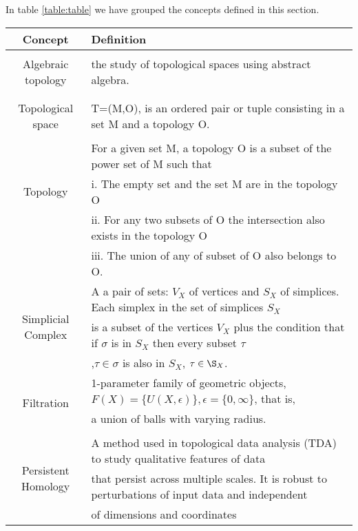 \documentclass[onecollarge,runningheads]{svjour2}
\begin{document}
In table \ref{table:table} we have grouped the concepts defined in this section.
\begin{center}
\begin{tabular}{ |c|l| }
\hline
 Concept & Definition\\ \hline
\multirow{3}{*}{Algebraic topology}
 & {}  \\
 & {the study of topological spaces using abstract algebra.}  \\
 & {}  \\ 
 \hline
\multirow{3}{*}{Topological space} 
 & { }  \\
 & {T=(M,O), is an ordered pair or tuple consisting in a set M and a topology O.}  \\
 &   \\ 
 \hline
 \multirow{3}{*}{Topology} 
 & {For a given set M, a topology O is a subset of the power set of M such that} \\
 & {i. The empty set and the set M are in the topology O }  \\
 &  {ii. For any two subsets of O the intersection also exists in the topology O } \\ 
  &  {iii. The union of any of subset of O also belongs to O.} \\ 
 \hline
\multirow{3}{*}{Simplicial Complex} 
 & {A a pair of sets: $V_X$ of vertices and $S_X$ of simplices. Each simplex in the set of simplices $S_X$ }  \\
 & {is a subset of the vertices $V_X$ plus the condition that if $\sigma$ is in $S_X$ then every subset $\tau$ }  \\
 & ,$\tau \in \sigma$ is also in $S_X$, $\tau \in \S_X$.  \\ 
 \hline
  \multirow{3}{*}{Filtration} 
 & {1-parameter family of geometric objects, $F(X) = \{U(X, \epsilon)\}, \epsilon = \{ 0, \infty\}$, that is, }  \\
 & {a union of balls with varying radius.}  \\
 &  \\ 
 \hline\multirow{3}{*}{Persistent Homology} 
 & {A method used in topological data analysis (TDA) to study qualitative features of data }  \\
 & {that persist across multiple scales. It is robust to perturbations of input data and  independent}  \\
 & {of dimensions and coordinates} \\ 
 \hline
\end{tabular}
\end{center}
\end{document}
